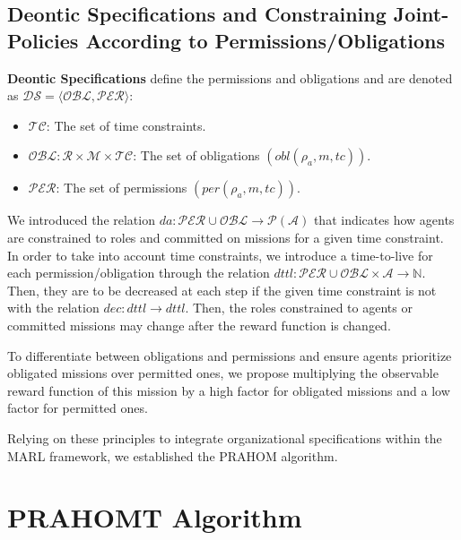 \documentclass[sigconf,anonymous]{aamas}
\begin{document}
\subsection{Deontic Specifications and Constraining Joint-Policies According to Permissions/Obligations}

\textbf{Deontic Specifications} define the permissions and obligations and are denoted as $\mathcal{DS} = \langle \mathcal{OBL}, \mathcal{PER} \rangle$:

\begin{itemize}
  \item $\mathcal{TC}$: The set of time constraints.
  \item $\mathcal{OBL}: \mathcal{R} \times \mathcal{M} \times \mathcal{TC}$: The set of obligations $(obl(\rho_a, m, tc))$.
  \item $\mathcal{PER}$: The set of permissions $(per(\rho_a, m, tc))$.
\end{itemize}

We introduced the relation $da: \mathcal{PER} \cup \mathcal{OBL} \rightarrow \mathcal{P}(\mathcal{A})$ that indicates how agents are constrained to roles and committed on missions for a given time constraint. In order to take into account time constraints, we introduce a time-to-live for each permission/obligation through the relation $dttl: \mathcal{PER} \cup \mathcal{OBL} \times \mathcal{A} \rightarrow \mathbb{N}$. Then, they are to be decreased at each step if the given time constraint is not  with the relation $dec: dttl \rightarrow dttl$. Then, the roles constrained to agents or committed missions may change after the reward function is changed.

To differentiate between obligations and permissions and ensure agents prioritize obligated missions over permitted ones, we propose multiplying the observable reward function of this mission by a high factor for obligated missions and a low factor for permitted ones.

Relying on these principles to integrate organizational specifications within the MARL framework, we established the PRAHOM algorithm.


\section{PRAHOMT Algorithm}\label{sec:prahom_alg}

\end{document}
